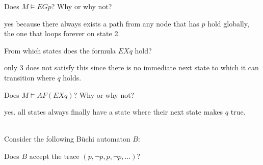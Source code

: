 \documentclass[11pt]{article}
\begin{document}
\begin{qunlist}
\begin{qparts}
\begin{answer}
    \end{answer}

  \item
    Does $M \models EG p$? Why or why not?

    \begin{answer}
      yes because there always exists a path from any node that has \(p\) hold globally, the one that loops forever on state 2.

    \end{answer}

  \item
    From which states does the formula $EX q$ hold?

    \begin{answer}
      only 3 does not satisfy this since there is no immediate next state to which it can transition where \(q\) holds.
    \end{answer}

  \item
    Does $M \models AF (EX q)$? Why or why not?

    \begin{answer}
      yes. all states always finally have a state where their next state makes \(q\) true.
    \end{answer}
  \end{qparts}


  \\
  Consider the following B\"uchi automaton $B$:


  \begin{qparts}
  \item
    Does $B$ accept the trace $(p, \lnot p, p, \lnot p, \dots)$?


\end{qparts}
\end{qunlist}
\end{document}
